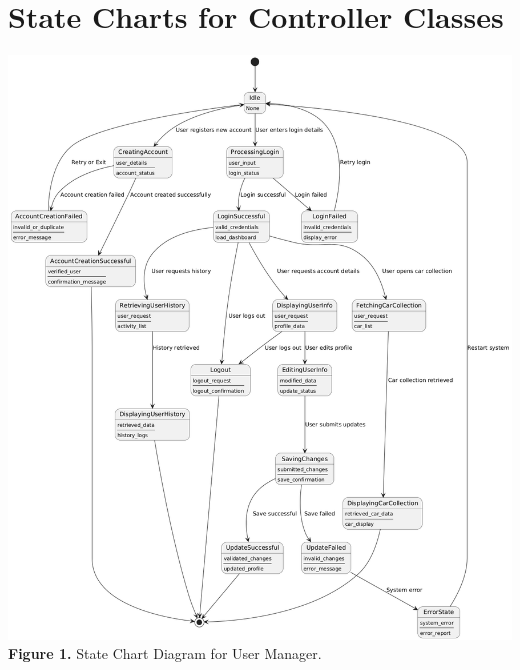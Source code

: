 \documentclass[]{article}
\begin{document}
 



\section{State Charts for Controller Classes}
\label{sec:state_charts_for_controller_classes}

\begin{center}
	\includegraphics[scale=0.43]{State Diagrams/omar_diagram.png}\\
	\textbf{Figure 1.} State Chart Diagram for User Manager.\\


\end{center}
\end{document}
